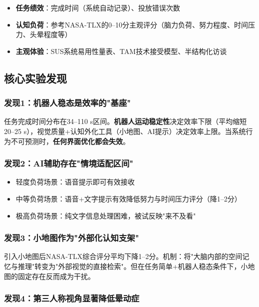 \documentclass[12pt,a4paper]{ctexart}
\begin{document}
\begin{itemize}
    \item \textbf{任务绩效}：完成时间（系统自动记录）、投放错误次数
    \item \textbf{认知负荷}：参考NASA-TLX的0--10分主观评分（脑力负荷、努力程度、时间压力、头晕程度等）
    \item \textbf{主观体验}：SUS系统易用性量表、TAM技术接受模型、半结构化访谈
\end{itemize}

\subsection{核心实验发现}

\subsubsection{发现1：机器人稳态是效率的"基座"}

任务完成时间分布在34--110 s区间。\textbf{机器人运动稳定性}决定效率下限（平均缩短20--25 s），视觉质量+认知外化工具（小地图、AI提示）决定效率上限。当系统行为不可预测时，\textbf{任何界面优化都会失效}。

\subsubsection{发现2：AI辅助存在"情境适配区间"}

\begin{itemize}
    \item 轻度负荷场景：语音提示即可有效接收
    \item 中等负荷场景：语音+文字提示有效降低努力与时间压力评分（降1--2分）
    \item 极高负荷场景：纯文字信息处理困难，被试反映"来不及看"
\end{itemize}

\subsubsection{发现3：小地图作为"外部化认知支架"}

引入小地图后NASA-TLX综合评分平均下降1--2分。机制：将"大脑内部的空间记忆与推理"转变为"外部视觉的直接检索"。但在任务简单+机器人稳态条件下，小地图的固定存在反而成为干扰。

\subsubsection{发现4：第三人称视角显著降低晕动症}
\end{document}
